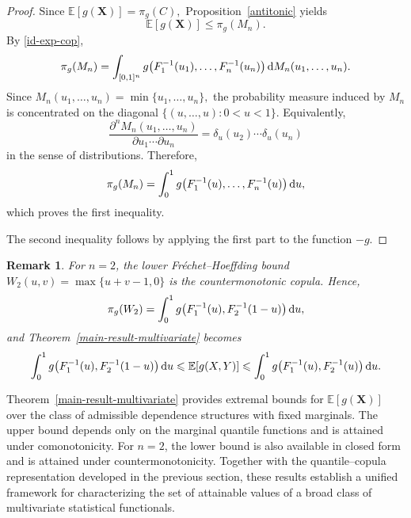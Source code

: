 \documentclass[12pt]{article}
\newtheorem{remark}[theo]{Remark}%
\begin{document}
\begin{proof}
	Since
	$
	\mathbb E[g(\boldsymbol X)]
	=
	\pi_g(C),
	$
	Proposition~\ref{antitonic} yields
	$$
	\mathbb E[g(\boldsymbol X)]
	\leqslant
	\pi_g(M_n).
	$$
	By \eqref{id-exp-cop},
	\[
	\pi_g(M_n)
	=
	\int_{[0,1]^n}
	g\!\left(
	F_1^{-1}(u_1),
	\ldots,
	F_n^{-1}(u_n)
	\right)
	{\rm d}M_n(u_1,\ldots,u_n).
	\]
	Since
	$
	M_n(u_1,\ldots,u_n)
	=
	\min\{u_1,\ldots,u_n\},
	$
	the probability measure induced by
	$M_n$
	is concentrated on the diagonal
	$
	\{(u,\ldots,u):0<u<1\}.
	$
Equivalently, \[ \frac{\partial^n M_n(u_1,\ldots,u_n)} {\partial u_1\cdots\partial u_n} = \delta_u(u_2)\cdots\delta_u(u_n) \] in the sense of distributions. Therefore, 
\[ 
\pi_g(M_n) = \int_0^1 g\!\left( F_1^{-1}(u), \ldots, F_n^{-1}(u) \right) {\rm d}u, 
\] 
which proves the first inequality.
	
	The second inequality follows by applying the first part to the function $-g$.
\end{proof}





\begin{remark}\label{rem-W2}
	For $n=2$, the lower Fréchet--Hoeffding bound
	$
	W_2(u,v)=\max\{u+v-1,0\}
	$
	is the countermonotonic copula. Hence,
	\[
	\pi_g(W_2)
	=
	\int_0^1
	g\!\left(
	F_1^{-1}(u),
	F_2^{-1}(1-u)
	\right)
	{\rm d}u,
	\]
	and Theorem~\ref{main-result-multivariate} becomes
	\[
	\int_0^1
	g\!\left(
	F_1^{-1}(u),
	F_2^{-1}(1-u)
	\right)
	{\rm d}u
	\leqslant
	\mathbb E[g(X,Y)]
	\leqslant
	\int_0^1
	g\!\left(
	F_1^{-1}(u),
	F_2^{-1}(u)
	\right)
	{\rm d}u.
	\]
\end{remark}


Theorem~\ref{main-result-multivariate} provides extremal bounds for
$\mathbb E[g(\boldsymbol X)]$
over the class of admissible dependence structures with fixed marginals.
The upper bound depends only on the marginal quantile functions and is attained under comonotonicity.
For $n=2$, the lower bound is also available in closed form and is attained under countermonotonicity. Together with the quantile--copula representation developed in the previous section, these results establish a unified framework for characterizing the set of attainable values of a broad class of multivariate statistical functionals.

\end{document}
